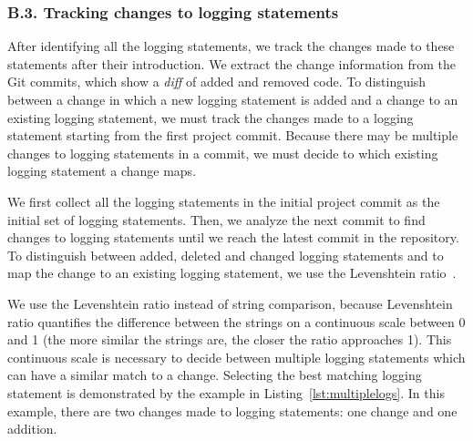 \subsubsection*{B.3. Tracking changes to logging statements}
After identifying all the logging statements, we track the changes made to these statements after their introduction. We extract the change information from the Git commits, which show a \emph{diff} of added and removed code. To distinguish between a change in which a new logging statement is added and a change to an existing logging statement, we must track the changes made to a logging statement starting from the first project commit. Because there may be multiple changes to logging statements in a commit, we must decide to which existing logging statement a change maps.

We first collect all the logging statements in the initial project commit as the initial set of logging statements. Then, we analyze the next commit to find changes to logging statements until we reach the latest commit in the repository. To distinguish between added, deleted and changed logging statements and to map the change to an existing logging statement, we use the Levenshtein ratio~\cite{levenshteinratio}. 

We use the Levenshtein ratio instead of string comparison, because Levenshtein ratio quantifies the difference between the strings on a continuous scale between 0 and 1 (the more similar the strings are, the closer the ratio approaches 1). This continuous scale is necessary to decide between multiple logging statements which can have a similar match to a change. Selecting the best matching logging statement is demonstrated by the example in Listing~\ref{lst:multiplelogs}. In this example, there are two changes made to logging statements: one change and one addition. 








